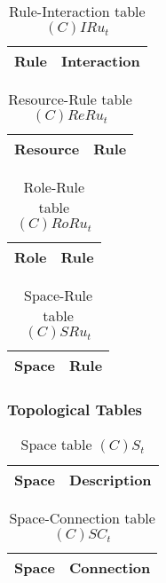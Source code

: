 \begin{table}[H]
	\centering
	\begin{tabular}{|p{4cm}|p{8cm}|}
			\hline
			\textbf{Rule} & \textbf{Interaction} \\
			\hline
		\end{tabular}
	\caption{Rule-Interaction table $(C)IRu_t$}
	\label{tab:cirut}
\end{table}

\begin{table}[H]
	\centering
	\begin{tabular}{|p{4cm}|p{8cm}|}
			\hline
			\textbf{Resource} & \textbf{Rule} \\
			\hline
		\end{tabular}
	\caption{Resource-Rule table $(C)ReRu_t$}
	\label{tab:crerut}
\end{table}

\begin{table}[H]
	\centering
	\begin{tabular}{|p{4cm}|p{8cm}|}
			\hline
			\textbf{Role} & \textbf{Rule} \\
			\hline
		\end{tabular}
	\caption{Role-Rule table $(C)RoRu_t$}
	\label{tab:crorut}
\end{table}

\begin{table}[H]
	\centering
	\begin{tabular}{|p{4cm}|p{8cm}|}
			\hline
			\textbf{Space} & \textbf{Rule} \\
			\hline
		\end{tabular}
	\caption{Space-Rule table $(C)SRu_t$}
	\label{tab:cot}
\end{table}

\subsubsection{Topological Tables}

\begin{table}[H]
	\centering
	\begin{tabular}{|p{4cm}|p{8cm}|}
			\hline
			\textbf{Space} & \textbf{Description} \\
			\hline
		\end{tabular}
	\caption{Space table $(C)S_t$}
	\label{tab:st}
\end{table}

\begin{table}[H]
	\centering
	\begin{tabular}{|p{4cm}|p{8cm}|}
			\hline
			\textbf{Space} & \textbf{Connection} \\
			\hline
		\end{tabular}
	\caption{Space-Connection table $(C)SC_t$}
	\label{tab:sct}
\end{table}

